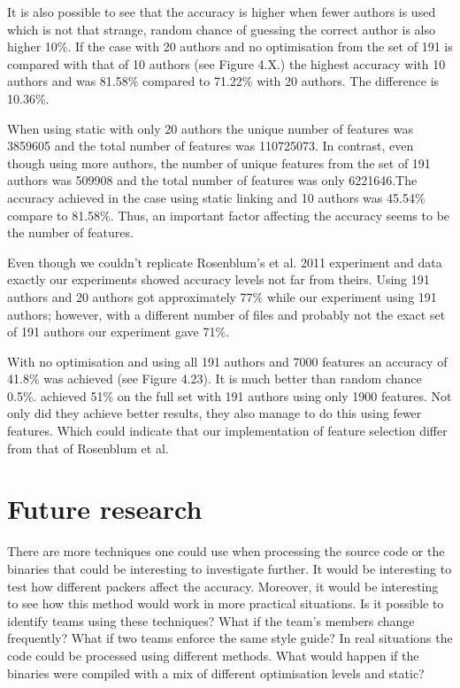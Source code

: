 \documentclass[a4paper,11pt]{kth-mag}
\begin{document}
It is also possible to see that the accuracy is higher when fewer authors is
used which is not that strange, random chance of guessing the correct author is
also higher 10\%. If the case with 20 authors and no optimisation from the set
of 191 is compared with that of 10 authors (see Figure 4.X.) the highest
accuracy with 10 authors and was 81.58\% compared to 71.22\% with 20 authors.
The difference is 10.36\%.

When using static with only 20 authors the unique number of features was
3859605 and the total number of features was 110725073. In contrast, even
though using more authors,  the number of unique features from the set of 191
authors was 509908 and the total number of features was only 6221646.The
accuracy achieved in the case using static linking and 10 authors was 45.54\%
compare to 81.58\%. Thus, an important factor affecting the accuracy seems to
be the number of features. 

Even though we couldn’t replicate Rosenblum’s et al. 2011 experiment and data
exactly our experiments showed accuracy levels not far from theirs. Using 191
authors and 20 authors \parencite{rosenblum2011wrote} got approximately 77\% while
our experiment using 191 authors; however, with a different number of files and
probably not the exact set of 191 authors our experiment gave 71\%.     

With no optimisation and using all 191 authors and 7000 features an accuracy of
41.8\% was achieved (see Figure 4.23). It is much better than random chance
0.5\%. \parencite{rosenblum2011wrote} achieved 51\% on the full set with 191
authors using only 1900 features. Not only did they achieve better results,
they also manage to do this using fewer features. Which could indicate that our
implementation of feature selection differ from that of Rosenblum et al.

\section{Future research}
There are more techniques one could use when processing the source code or the
binaries that could be interesting to investigate further. It would be
interesting to test how different packers affect the accuracy. Moreover, it
would be interesting to see how this method would work in more practical
situations. Is it possible to identify teams using these techniques? What if
the team’s members change frequently? What if two teams enforce the same style
guide? In real situations the code could be processed using different methods.
What would happen if the binaries were compiled with a mix of different
optimisation levels and static?  
\end{document}
